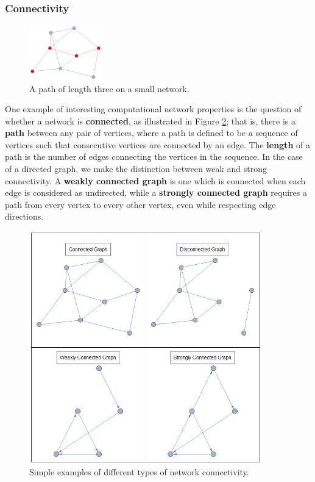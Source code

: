 \documentclass[12pt]{thesis}
\theoremstyle{plain}
\theoremstyle{definition}
\theoremstyle{remark}
\begin{document}
\subsubsection{Connectivity}

\begin{figure}
\centering
\vspace{-20pt}
\includegraphics[width=0.28\textwidth]{path_demo.png}
\caption{A path of length three on a small network.}
\vspace{-20pt}
\label{fig:path_demo}
\end{figure}

One example of interesting computational network properties is the question of whether a network is \textbf{connected}, as illustrated in Figure \ref{fig:connectivity_demo}; that is, there is a \textbf{path} between any pair of vertices, where a path is defined to be a sequence of vertices such that consecutive vertices are connected by an edge. The \textbf{length} of a path is the number of edges connecting the vertices in the sequence. In the case of a directed graph, we make the distinction between weak and strong connectivity. A \textbf{weakly connected graph} is one which is connected when each edge is considered as undirected, while a \textbf{strongly connected graph} requires a path from every vertex to every other vertex, even while respecting edge directions. 

\begin{figure}[h]
\centering
\includegraphics[width=0.9\textwidth]{connectivity_demo.png}
\caption{Simple examples of different types of network connectivity.}
\label{fig:connectivity_demo}
\end{figure}
\end{document}
